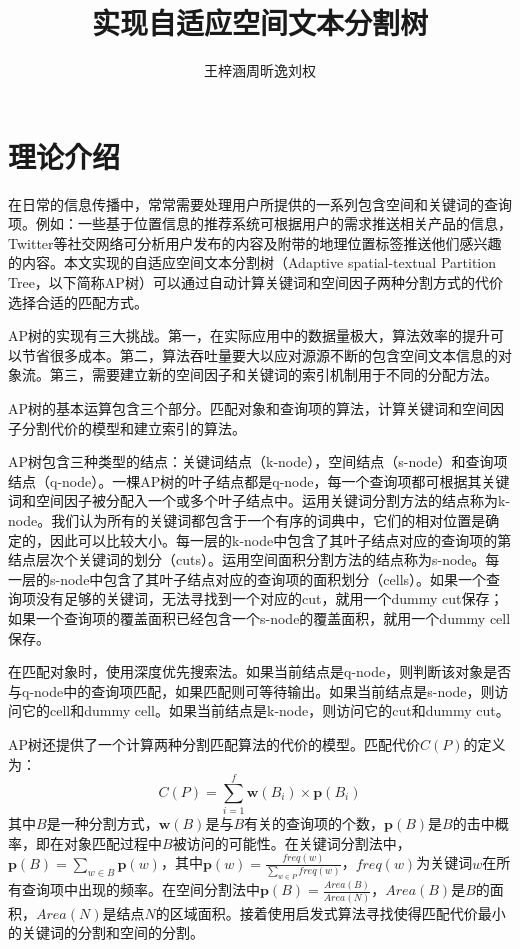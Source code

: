 \documentclass[UTF8]{ctexart}
\title{实现自适应空间文本分割树}
\author{王梓涵\quad 周昕逸\quad 刘权}
\date{}
\begin{document}
\maketitle

\linespread{0.5}
\setlength{\parskip}{0.5\baselineskip}

\section{理论介绍}

在日常的信息传播中，常常需要处理用户所提供的一系列包含空间和关键词的查询项。例如：一些基于位置信息的推荐系统可根据用户的需求推送相关产品的信息，Twitter等社交网络可分析用户发布的内容及附带的地理位置标签推送他们感兴趣的内容。本文实现的自适应空间文本分割树（Adaptive spatial-textual Partition Tree，以下简称AP树）可以通过自动计算关键词和空间因子两种分割方式的代价选择合适的匹配方式。

AP树的实现有三大挑战。第一，在实际应用中的数据量极大，算法效率的提升可以节省很多成本。第二，算法吞吐量要大以应对源源不断的包含空间文本信息的对象流。第三，需要建立新的空间因子和关键词的索引机制用于不同的分配方法。

AP树的基本运算包含三个部分。匹配对象和查询项的算法，计算关键词和空间因子分割代价的模型和建立索引的算法。

AP树包含三种类型的结点：关键词结点（k-node），空间结点（s-node）和查询项结点（q-node）。一棵AP树的叶子结点都是q-node，每一个查询项都可根据其关键词和空间因子被分配入一个或多个叶子结点中。运用关键词分割方法的结点称为k-node。我们认为所有的关键词都包含于一个有序的词典中，它们的相对位置是确定的，因此可以比较大小。每一层的k-node中包含了其叶子结点对应的查询项的第结点层次个关键词的划分（cuts）。运用空间面积分割方法的结点称为s-node。每一层的s-node中包含了其叶子结点对应的查询项的面积划分（cells）。如果一个查询项没有足够的关键词，无法寻找到一个对应的cut，就用一个dummy cut保存；如果一个查询项的覆盖面积已经包含一个s-node的覆盖面积，就用一个dummy cell保存。

在匹配对象时，使用深度优先搜索法。如果当前结点是q-node，则判断该对象是否与q-node中的查询项匹配，如果匹配则可等待输出。如果当前结点是s-node，则访问它的cell和dummy cell。如果当前结点是k-node，则访问它的cut和dummy cut。

AP树还提供了一个计算两种分割匹配算法的代价的模型。匹配代价$C(P)$的定义为：\[C(P)=\sum_{i=1}^f \mathbf{w}(B_i)\times \mathbf{p}(B_i)\]其中$B$是一种分割方式，$\mathbf{w}(B)$是与$B$有关的查询项的个数，$\mathbf{p}(B)$是$B$的击中概率，即在对象匹配过程中$B$被访问的可能性。在关键词分割法中，$\mathbf{p}(B)=\sum_{w\in B} \mathbf{p}(w)$，其中$\mathbf{p}(w)=\frac{freq(w)}{\sum_{w\in P}freq(w)}$，$freq(w)$为关键词$w$在所有查询项中出现的频率。在空间分割法中$\mathbf{p}(B)=\frac{Area(B)}{Area(N)}$，$Area(B)$是$B$的面积，$Area(N)$是结点$N$的区域面积。接着使用启发式算法寻找使得匹配代价最小的关键词的分割和空间的分割。
\end{document}
